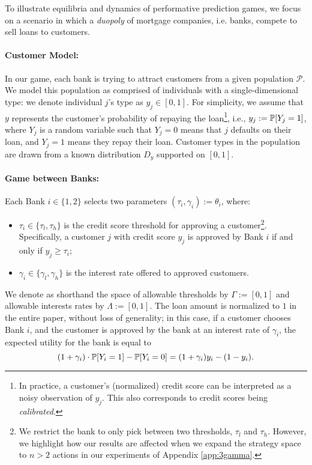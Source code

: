 To illustrate equilibria and dynamics of performative prediction games, we focus on a scenario in which a \emph{duopoly} of mortgage companies, i.e. banks, compete to sell loans to customers.

\paragraph{Customer Model:} In our game, each bank is trying to attract customers from a given population $\mathcal{P}$. We model this population as comprised of individuals with a single-dimensional type: we denote individual $j$'s type as $y_j \in [0,1]$. For simplicity, we assume that \(y\) represents the customer’s probability of repaying the loan\footnote{In practice, a customer's (normalized) credit score can be interpreted as a noisy observation of $y_j$. This also corresponds to credit scores being \emph{calibrated}.}, i.e., $y_j := \P[Y_j = 1]$, where $Y_j$ is a random variable such that $Y_j = 0$ means that $j$ defaults on their loan, and $Y_j = 1$ means they repay their loan. Customer types in the population are drawn from a known distribution $D_y$ supported on $[0,1]$. 

\paragraph{Game between Banks:} Each Bank \(i \in \{1, 2\}\) selects two parameters \( (\tau_i, \gamma_i) := \theta_i\), where:
\begin{itemize}
    \item \(\tau_i \in \{\tau_l,\tau_h\}\) is the credit score threshold for approving a customer\footnote{We restrict the bank to only pick between two thresholds, $\tau_l$ and $\tau_h$. However, we highlight how our results are affected when we expand the strategy space to $n > 2$ actions in our experiments of Appendix \ref{app:3gamma}.}. Specifically, a customer $j$ with credit score \(y_j\) is approved by Bank $i$ if and only if \(y_j \geq \tau_i\);
    \item \(\gamma_i \in \{\gamma_l, \gamma_h\}\) is the interest rate offered to approved customers.
\end{itemize}
We denote as shorthand the space of allowable thresholds by $\Gamma := [0,1]$ and allowable interests rates by $\Lambda := [0,1]$. %
The loan amount is normalized to $1$ in the entire paper, without loss of generality; in this case, if a customer chooses Bank $i$, and the customer is approved by the bank at an interest rate of $\gamma_i$, the expected utility for the bank is equal to
\[
(1+\gamma_i)\cdot \P[Y_i = 1]-\P[Y_i = 0] = (1+\gamma_i)y_i-(1-y_i).
\]



